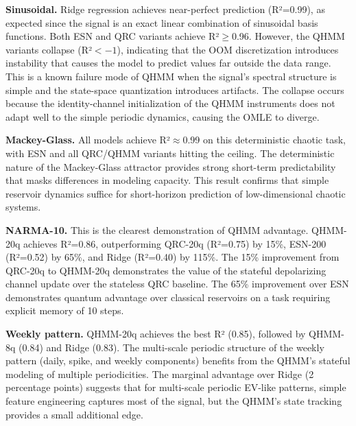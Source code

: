 
\textbf{Sinusoidal.} Ridge regression achieves near-perfect prediction
(R²=0.99), as expected since the signal is an exact linear combination
of sinusoidal basis functions. Both ESN and QRC variants achieve
R²$\geq$0.96. However, the QHMM variants collapse (R²$<-1$), indicating
that the OOM discretization introduces instability that causes the model
to predict values far outside the data range. This is a known failure
mode of QHMM when the signal's spectral structure is simple and the
state-space quantization introduces artifacts. The collapse occurs because
the identity-channel initialization of the QHMM instruments does not
adapt well to the simple periodic dynamics, causing the OMLE to diverge.


\textbf{Mackey-Glass.} All models achieve R²$\approx$0.99 on this
deterministic chaotic task, with ESN and all QRC/QHMM variants hitting
the ceiling. The deterministic nature of the Mackey-Glass attractor
provides strong short-term predictability that masks differences in
modeling capacity. This result confirms that simple reservoir dynamics
 suffice for short-horizon prediction of low-dimensional chaotic
systems.


\textbf{NARMA-10.} This is the clearest demonstration of QHMM advantage.
QHMM-20q achieves R²=0.86, outperforming QRC-20q (R²=0.75) by 15\%,
ESN-200 (R²=0.52) by 65\%, and Ridge (R²=0.40) by 115\%. The 15\%
improvement from QRC-20q to QHMM-20q demonstrates the value of the
stateful depolarizing channel update over the stateless QRC baseline.
The 65\% improvement over ESN demonstrates quantum advantage over classical
reservoirs on a task requiring explicit memory of 10 steps.


\textbf{Weekly pattern.} QHMM-20q achieves the best R² (0.85), followed
by QHMM-8q (0.84) and Ridge (0.83). The multi-scale periodic structure
of the weekly pattern (daily, spike, and weekly components) benefits from
the QHMM's stateful modeling of multiple periodicities. The marginal
advantage over Ridge (2 percentage points) suggests that for multi-scale
periodic EV-like patterns, simple feature engineering captures most of the
signal, but the QHMM's state tracking provides a small additional edge.

